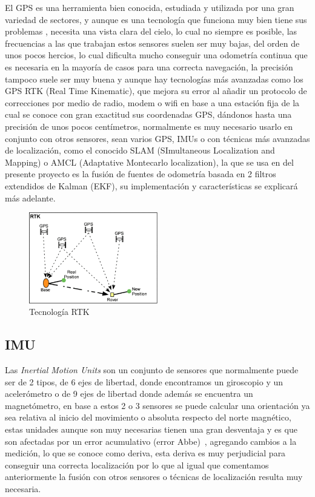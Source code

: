 El GPS es una herramienta bien conocida, estudiada y utilizada por una gran variedad de sectores, y aunque es una tecnología que funciona 
muy bien tiene sus problemas , necesita una vista clara del cielo, lo cual no siempre es posible, las frecuencias a las que trabajan estos 
sensores suelen ser muy bajas, del orden de unos pocos hercios, lo cual dificulta mucho conseguir una odometría continua que es necesaria en 
la mayoría de casos para una correcta navegación, la precisión tampoco suele ser muy buena y aunque hay tecnologías más avanzadas como los 
GPS RTK (Real Time Kinematic), que mejora su error al añadir un protocolo de correcciones por medio de radio, modem o wifi en base a una 
estación fija de la cual se conoce con gran exactitud sus coordenadas GPS, dándonos hasta una precisión de unos pocos centímetros, 
normalmente es muy necesario usarlo en conjunto con otros sensores, sean varios GPS, IMUs o con técnicas más avanzadas de localización, 
como el conocido SLAM (SImultaneous Localization and Mapping) o AMCL (Adaptative Montecarlo localization), la que se usa en del presente 
proyecto es la fusión de fuentes de odometría basada en 2 filtros extendidos de Kalman (EKF), su implementación y características se 
explicará más adelante.

\begin{figure}[h]
    \centering
    \includegraphics[width=0.5\textwidth]{images/rtk_arquitecture.png}
    \caption{Tecnología RTK}
    \label{fig:rtk_tech}
\end{figure}
\subsection{IMU}

Las \textit{Inertial Motion Units} son un conjunto de sensores que normalmente puede ser de 2 tipos, de 6 ejes de libertad, 
donde encontramos un giroscopio y un acelerómetro o de 9 ejes de libertad donde además se encuentra un magnetómetro, en base a 
estos 2 o 3 sensores se puede calcular una orientación ya sea relativa al inicio del movimiento o absoluta respecto del norte magnético, 
estas unidades aunque son muy necesarias tienen una gran desventaja y es que son afectadas por un error acumulativo (error Abbe)~\cite{errorAbbe23}, agregando cambios a 
la medición, lo que se conoce como deriva, esta deriva es muy perjudicial para conseguir una correcta localización por lo que al igual que 
comentamos anteriormente la fusión con otros sensores o técnicas de localización resulta muy necesaria.
\cleardoublepage

